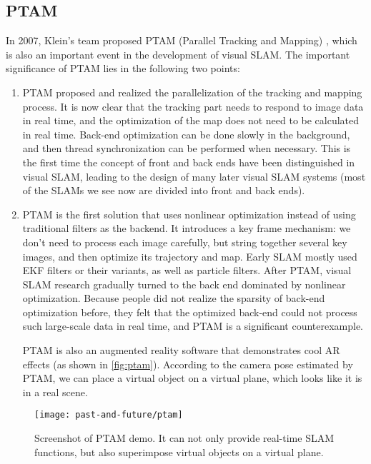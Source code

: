 \subsection{PTAM}
In 2007, Klein's team proposed PTAM (Parallel Tracking and Mapping) {\cite{Klein2007}}, which is also an important event in the development of visual SLAM. The important significance of PTAM lies in the following two points:
\begin{enumerate}
	\item PTAM proposed and realized the parallelization of the tracking and mapping process. It is now clear that the tracking part needs to respond to image data in real time, and the optimization of the map does not need to be calculated in real time. Back-end optimization can be done slowly in the background, and then thread synchronization can be performed when necessary. This is the first time the concept of front and back ends have been distinguished in visual SLAM, leading to the design of many later visual SLAM systems (most of the SLAMs we see now are divided into front and back ends).
	\item PTAM is the first solution that uses nonlinear optimization instead of using traditional filters as the backend. It introduces a key frame mechanism: we don't need to process each image carefully, but string together several key images, and then optimize its trajectory and map. Early SLAM mostly used EKF filters or their variants, as well as particle filters. After PTAM, visual SLAM research gradually turned to the back end dominated by nonlinear optimization. Because people did not realize the sparsity of back-end optimization before, they felt that the optimized back-end could not process such large-scale data in real time, and PTAM is a significant counterexample.
	
	\hspace{2em}PTAM is also an augmented reality software that demonstrates cool AR effects (as shown in \autoref{fig:ptam}). According to the camera pose estimated by PTAM, we can place a virtual object on a virtual plane, which looks like it is in a real scene.
\end{enumerate}

\begin{figure}[!ht]
	\centering
	\texttt{[image: past-and-future/ptam]}
	\caption{Screenshot of PTAM demo. It can not only provide real-time SLAM functions, but also superimpose virtual objects on a virtual plane.}
	\label{fig:ptam}
\end{figure}

